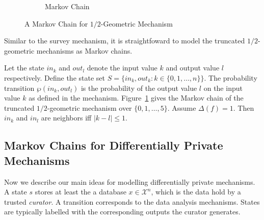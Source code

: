 \begin{figure}
\begin{subfigure}{.50\columnwidth}
{
    }
    \caption{Markov Chain}
    \label{figure:geometric-mechanism-markov-chain}
  \end{subfigure}

  \caption{A Markov Chain for $1/2$-Geometric Mechanism}
  \label{figure:geometric-mechanism}
\end{figure}

Similar to the survey mechanism, it is
straightfoward to model the truncated $1/2$-geometric
mechanisms as Markov chains.

\begin{example}
Let the state $in_k$ and $out_l$
denote the input value $k$ and output value $l$ respectively. Define
the state set $S = \{ in_k, out_k : k \in \{ 0, 1, \ldots, n \} \}$.
The probability transition $\wp (in_k, out_l)$ is the probability of the
output value $l$ on the input value $k$ as defined in the
mechanism. Figure~\ref{figure:geometric-mechanism-markov-chain} gives
the Markov chain of the truncated
$1/2$-geometric mechanism over $\{ 0, 1, \ldots, 5 \}$. Assume
$\Delta (f) = 1$. Then $in_k$ and $in_l$ are
neighbors iff $| k - l | \leq 1$.
\end{example}

\subsection{Markov Chains for Differentially Private Mechanisms}
Now we describe our main ideas for  modelling differentially private mechanisms.
A state $s$ stores at least the a database $x\in \mathcal{X}^n$, which is the data hold by a trusted \emph{curator}. A transition corresponds to the data analysis mechanisms.
States are typically labelled with the corresponding outputs
the curator generates.

